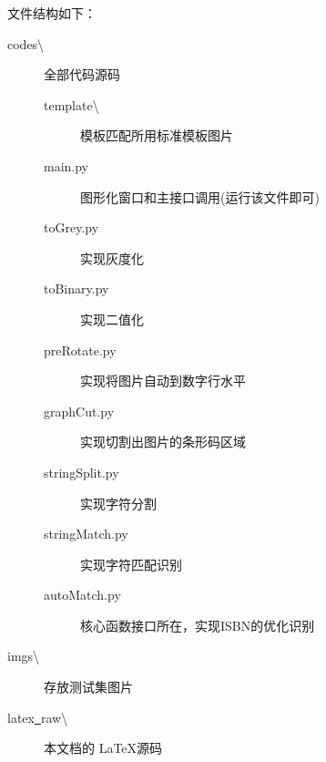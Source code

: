 \documentclass{ctexart}
\begin{document}
文件结构如下：
\begin{description}
    \item[codes\textbackslash] 全部代码源码
    \begin{description}
        \item[template\textbackslash] 模板匹配所用标准模板图片 
        \item[main.py] 图形化窗口和主接口调用(运行该文件即可)
        \item[toGrey.py] 实现灰度化
        \item[toBinary.py] 实现二值化
        \item[preRotate.py] 实现将图片自动到数字行水平
        \item[graphCut.py] 实现切割出图片的条形码区域
        \item[stringSplit.py] 实现字符分割
        \item[stringMatch.py] 实现字符匹配识别
        \item[autoMatch.py] 核心函数接口所在，实现ISBN的优化识别
    \end{description}
    \item[imgs\textbackslash] 存放测试集图片
    \item[latex\underline\ raw\textbackslash] 本文档的 \LaTeX 源码 
\end{description}
\end{document}
